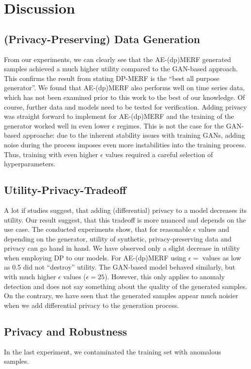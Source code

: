 \section{Discussion}

\subsection{(Privacy-Preserving) Data Generation}
From our experiments, we can clearly see that the AE-(dp)MERF generated samples achieved a much higher utility compared to the GAN-based approach. This confirms the result from \parencite{hu2023sok} stating DP-MERF is the ``best all purpose generator''. We found that AE-(dp)MERF also performs well on time series data, which has not been examined prior to this work to the best of our knowledge. Of course, further data and models need to be tested for verification. Adding privacy was straight forward to implement for AE-(dp)MERF and the training of the generator worked well in even lower $\epsilon$ regimes. This is not the case for the GAN-based approache: due to the inherent stability issues with training GANs, adding noise during the process imposes even more instabilities into the training process. Thus, training with even higher \(\epsilon\) values required a careful selection of hyperparameters.


\subsection{Utility-Privacy-Tradeoff}

A lot if studies suggest, that adding (differential) privacy to a model decreases its utility. Our result suggest, that this tradeoff is more nuanced and depends on the use case. The conducted experiments show, that for reasonable $\epsilon$ values and depending on the generator, utility of synthetic, privacy-preserving data and privacy can go hand in hand. We have observed only a slight decrease in utility when employing DP to our models. For AE-(dp)MERF using $\epsilon=$ values as low as 0.5 did not ``destroy'' utility. The GAN-based model behaved similarly, but with much higher \(\epsilon\) values ($\epsilon=25$). However, this only applies to anomaly detection and does not say something about the quality of the generated samples. On the contrary, we have seen that the generated samples appear much noisier when we add differential privacy to the generation process.

\subsection{Privacy and Robustness}
In the last experiment, we contaminated the training set with anomalous samples. 